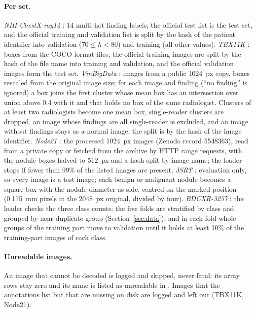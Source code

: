 \paragraph{Per set.} \emph{NIH ChestX-ray14} \citep{wang2017chestxray}: 14 multi-hot finding labels; the official test list is the test set, and
the official training and validation list is split by the hash of the patient identifier into validation ($70\le h<80$) and training (all other
values). \emph{TBX11K} \citep{liu2020tbx11k}: boxes from the COCO-format files; the official training images are split by the hash of the file name
into training and validation, and the official validation images form the test set. \emph{VinBigData} \citep{vinbigdata2020kaggle}: images from a
public 1024~px copy, boxes rescaled from the original image size; for each image and finding (``no finding'' is ignored) a box joins the first
cluster whose mean box has an intersection over union above 0.4 with it and that holds no box of the same radiologist. Clusters of at least two
radiologists become one mean box, single-reader clusters are dropped, an image whose findings are all single-reader is excluded, and an image
without findings stays as a normal image; the split is by the hash of the image identifier. \emph{Node21} \citep{sogancioglu2024node21}: the
processed 1024~px images (Zenodo record 5548363), read from a private copy or fetched from the archive by HTTP range requests, with the nodule
boxes halved to 512~px and a hash split by image name; the loader stops if fewer than 99\% of the listed images are present. \emph{JSRT}
\citep{shiraishi2000jsrt}: evaluation only, so every image is a test image; each benign or malignant nodule becomes a square box with the nodule
diameter as side, centred on the marked position (0.175~mm pixels in the 2048~px original, divided by four). \emph{BDCXR-3257}
\citep{durjoy2026bdcxr}: the loader checks the three class counts; the five folds are stratified by class and grouped by near-duplicate group
(Section~\ref{sec:data}), and in each fold whole groups of the training part move to validation until it holds at least 10\% of the training-part images of each
class.

\paragraph{Unreadable images.} An image that cannot be decoded is logged and skipped, never fatal: its array rows stay zero and its name is
listed as unreadable in . Images that the annotations list but that are missing on disk are logged and left out (TBX11K,
Node21).

